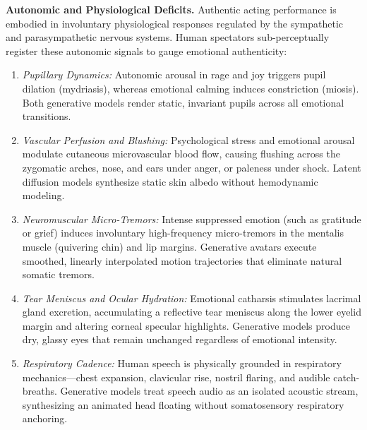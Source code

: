 \documentclass[pdflatex,sn-mathphys-num]{sn-jnl}
\theoremstyle{thmstyleone}
\theoremstyle{thmstyletwo}
\theoremstyle{thmstylethree}
\begin{document}
\textbf{Autonomic and Physiological Deficits.} Authentic acting performance is embodied in involuntary physiological responses regulated by the sympathetic and parasympathetic nervous systems. Human spectators sub-perceptually register these autonomic signals to gauge emotional authenticity:
\begin{enumerate}
    \item \textit{Pupillary Dynamics:} Autonomic arousal in rage and joy triggers pupil dilation (mydriasis), whereas emotional calming induces constriction (miosis). Both generative models render static, invariant pupils across all emotional transitions.
    \item \textit{Vascular Perfusion and Blushing:} Psychological stress and emotional arousal modulate cutaneous microvascular blood flow, causing flushing across the zygomatic arches, nose, and ears under anger, or paleness under shock. Latent diffusion models synthesize static skin albedo without hemodynamic modeling.
    \item \textit{Neuromuscular Micro-Tremors:} Intense suppressed emotion (such as gratitude or grief) induces involuntary high-frequency micro-tremors in the mentalis muscle (quivering chin) and lip margins. Generative avatars execute smoothed, linearly interpolated motion trajectories that eliminate natural somatic tremors.
    \item \textit{Tear Meniscus and Ocular Hydration:} Emotional catharsis stimulates lacrimal gland excretion, accumulating a reflective tear meniscus along the lower eyelid margin and altering corneal specular highlights. Generative models produce dry, glassy eyes that remain unchanged regardless of emotional intensity.
    \item \textit{Respiratory Cadence:} Human speech is physically grounded in respiratory mechanics---chest expansion, clavicular rise, nostril flaring, and audible catch-breaths. Generative models treat speech audio as an isolated acoustic stream, synthesizing an animated head floating without somatosensory respiratory anchoring.
\end{enumerate}
\end{document}
